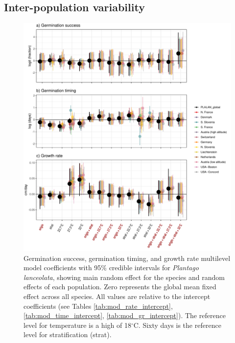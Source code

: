 \documentclass[12pt]{article}\usepackage[]{graphicx}\usepackage[]{color}
\begin{document}
\subsection{Inter-population variability}
\pagebreak
\begin{figure}[H]
\centering
\includegraphics[scale=.75]{PLALAN_pops_plot.pdf}
\caption{Germination success, germination timing, and growth rate multilevel model coefficients with 95\% credible intervals for \textit{Plantago lanceolata}, showing main random effect for the species and random effects of each population. Zero represents the global mean fixed effect across all species. All values are relative to the intercept coefficients (see Tables \ref{tab:mod_rate_intercept}, \ref{tab:mod_time_intercept}, \ref{tab:mod_gr_intercept}). The reference level for temperature is a high of 18$^\circ$C.  Sixty days is the reference level for stratification (strat).}
\label{fig:pops}
\end{figure}
\end{document}
